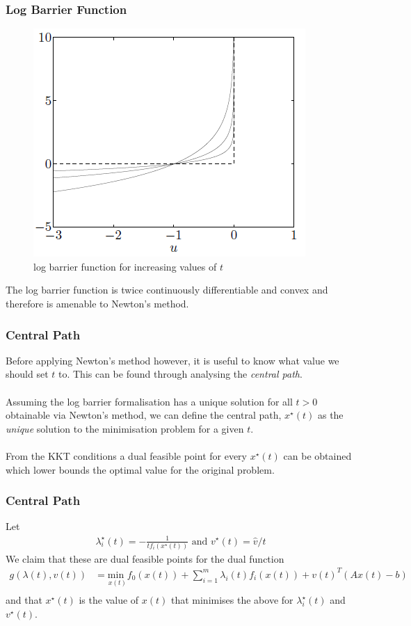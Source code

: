 \documentclass{beamer}
\begin{document}
\begin{frame}
    \frametitle{Log Barrier Function}
    \begin{figure}[t]
        \centering
        \includegraphics[scale=0.6]{barrier_function}
        \caption{log barrier function for increasing values of $t$}
        \label{fig:logbar}
    \end{figure}
    The log barrier function is twice continuously differentiable and convex
    and therefore is amenable to Newton's method.
\end{frame}


\begin{frame}
    \frametitle{Central Path}
    Before applying Newton's method however, it is useful to know what value we
    should set $t$ to. This can be found through analysing the \textit{central
    path}.
    \\~\\
    Assuming the log barrier formalisation has a unique solution for all
    $t > 0$ obtainable via Newton's method, we can define the central path,
    $x^{\star}(t)$ as the \textit{unique} solution to the minimisation problem for a given
    $t$.
    \\~\\
    From the KKT conditions a dual feasible point for every
    $x^{\star}(t)$ can be obtained which lower bounds the optimal value for
    the original problem.
\end{frame}

\begin{frame}
    \frametitle{Central Path}
    Let
    \begin{align*}
        \lambda_{i}^{\star}(t) = -\frac{1}{t f_{i}(x^{\star}(t))} \text{ and }
        v^{\star}(t) = \hat{v} / {t}
    \end{align*}
    We claim that these are dual feasible points for the dual function
    \begin{align*}
        g(\lambda(t), v(t)) &= \underset{x(t)}{\text{min }}f_{0}(x(t))
        + \sum\limits_{i=1}^{m}\lambda_{i}(t)f_{i}(x(t))
        + v(t)^{T}(Ax(t) - b) \\
    \end{align*}
    and that $x^{\star}(t)$ is the value of $x(t)$ that minimises the above for
    $\lambda_{i}^{\star}(t)$ and $v^{\star}(t)$.
\end{frame}
\end{document}
